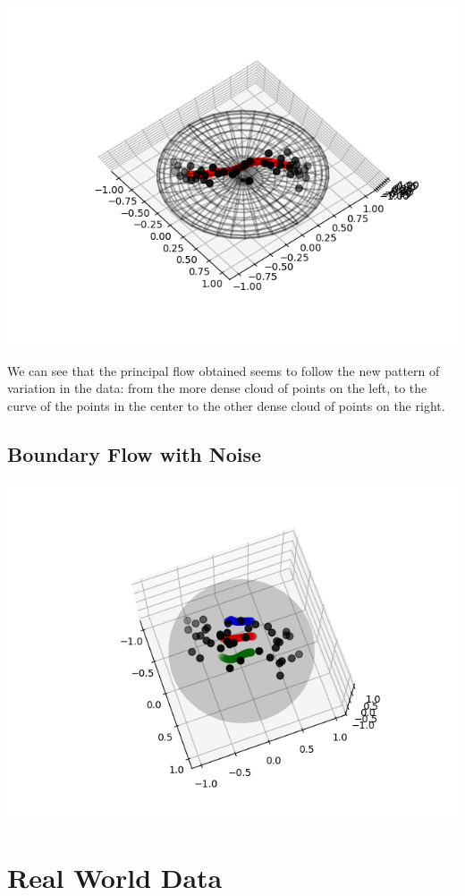 \documentclass[12pt]{report}
\begin{document}
\includegraphics[]{noisy_13_gaussian.png}

We can see that the principal flow obtained seems to follow the new pattern 
of variation in the data: from the more dense cloud of points on the left, to the curve of
the points in the center to the other dense cloud of points on the right.

\subsection{Boundary Flow with Noise}


\includegraphics[]{noisy_boundary_flow13.png}

\section{Real World Data}
\end{document}
